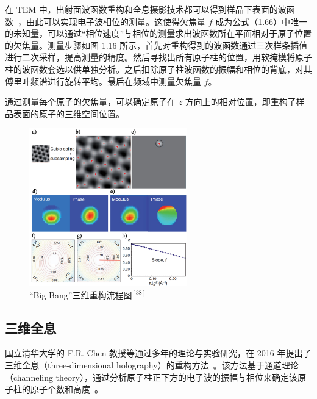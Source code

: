 在 TEM 中，出射面波函数重构和全息摄影技术都可以得到样品下表面的波函数~\cite{Ming2018,Ishizuka2013,Allen2004,Haigh2013,Morgan2011,Thust1996,OpdeBeeck1996,Zandbergen1996,Coene1992,Coene1996}，由此可以实现电子波相位的测量。这使得欠焦量 $f$ 成为公式（1.66）中唯一的未知量，可以通过“相位速度”与相位的测量求出波函数所在平面相对于原子位置的欠焦量。测量步骤如图 1.16 所示，首先对重构得到的波函数通过三次样条插值进行二次采样，提高测量的精度。然后寻找出所有原子柱的位置，用软掩模将原子柱的波函数套选以供单独分析。之后扣除原子柱波函数的振幅和相位的背底，对其傅里叶频谱进行旋转平均。最后在频域中测量欠焦量 $f$。

通过测量每个原子的欠焦量，可以确定原子在 $z$ 方向上的相对位置，即重构了样品表面的原子的三维空间位置。

\begin{figure}[H]
	\vspace{\baselineskip}
	\centering
	\includegraphics[width=0.61\textwidth]{../1.14/1_14}
	\caption{“Big Bang”三维重构流程图$^{[38]}$}\label{fig:114}
\end{figure}

\subsection{三维全息}
国立清华大学的 F.R. Chen 教授等通过多年的理论与实验研究，在 2016 年提出了三维全息（three-dimensional holography）的重构方法~\cite{ChenFR2017,ChenFR2016}。该方法基于通道理论（channeling theory），通过分析原子柱正下方的电子波的振幅与相位来确定该原子柱的原子个数和高度~\cite{ChenFR2015,WangA2012,WangA2010}。

